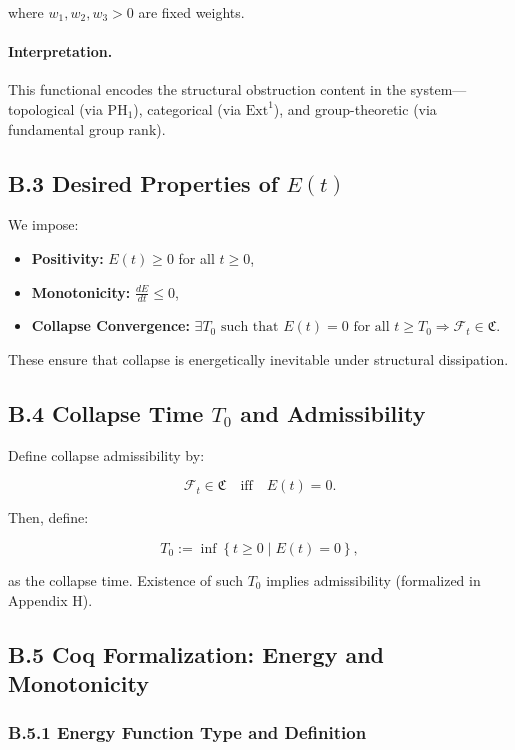 \documentclass[11pt]{article}
\begin{document}
where \( w_1, w_2, w_3 > 0 \) are fixed weights.

\paragraph{Interpretation.}  
This functional encodes the structural obstruction content in the system—topological (via \( \mathrm{PH}_1 \)), categorical (via \( \mathrm{Ext}^1 \)), and group-theoretic (via fundamental group rank).

\subsection*{B.3 Desired Properties of \( E(t) \)}

We impose:

\begin{itemize}
  \item \textbf{Positivity:} \( E(t) \geq 0 \) for all \( t \geq 0 \),
  \item \textbf{Monotonicity:} \( \frac{dE}{dt} \leq 0 \),
  \item \textbf{Collapse Convergence:} \( \exists T_0 \text{ such that } E(t) = 0 \text{ for all } t \geq T_0 \Rightarrow \mathcal{F}_t \in \mathfrak{C} \).
\end{itemize}

These ensure that collapse is energetically inevitable under structural dissipation.

\subsection*{B.4 Collapse Time \( T_0 \) and Admissibility}

Define collapse admissibility by:

\[
\mathcal{F}_t \in \mathfrak{C} \quad \text{iff} \quad E(t) = 0.
\]

Then, define:

\[
T_0 := \inf \left\{ t \geq 0 \mid E(t) = 0 \right\},
\]

as the collapse time. Existence of such \( T_0 \) implies admissibility (formalized in Appendix H).

\subsection*{B.5 Coq Formalization: Energy and Monotonicity}

\subsubsection*{B.5.1 Energy Function Type and Definition}
\end{document}
